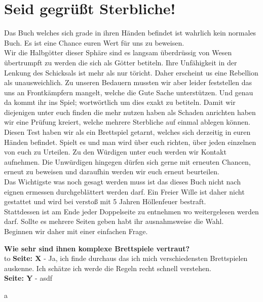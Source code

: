 \documentclass[12pt,a4paper,twoside]{book}
\begin{document}
\newpage


\section*{Seid gegrüßt Sterbliche!}


Das Buch welches sich grade in ihren Händen befindet ist wahrlich kein normales Buch. Es ist eine Chance euren Wert für uns zu beweisen.\\
Wir die Halbgötter dieser Sphäre sind es langsam überdrüssig von Wesen übertrumpft zu werden die sich als Götter betiteln. Ihre Unfähigkeit in der Lenkung des Schicksals ist mehr als nur töricht. Daher erscheint us eine Rebellion als unausweichlich. Zu unseren Bedauern mussten wir aber leider feststellen das uns an Frontkämpfern mangelt, welche die Gute Sache unterstützen. Und genau da kommt ihr ins Spiel; wortwörtlich um dies exakt zu betiteln.
Damit wir diejenigen unter euch finden die mehr nutzen haben als Schaden anrichten haben wir eine Prüfung kreiert, welche mehrere Sterbliche auf einmal ablegen können.\\
Diesen Test haben wir als ein Brettspiel getarnt, welches sich derzeitig in euren Händen befindet. Spielt es und man wird über euch richten, über jeden einzelnen von euch zu Urteilen. Zu den Würdigen unter euch werden wir Kontakt aufnehmen. Die Unwürdigen hingegen dürfen sich gerne mit erneuten Chancen, erneut zu beweisen und daraufhin werden wir euch erneut beurteilen.\\

Das Wichtigste was noch gesagt werden muss ist das dieses Buch nicht nach eignen ermessen durchgeblättert werden darf. Ein Freier Wille ist daher nicht gestattet und wird bei verstoß mit 5 Jahren Höllenfeuer bestraft.\\
Stattdessen ist am Ende jeder Doppelseite zu entnehmen wo weitergelesen werden darf. Sollte es mehrere Seiten geben habt ihr ausnahmsweise die Wahl.\\
Beginnen wir daher mit einer einfachen Frage.
\vfill


\textbf{Wie sehr sind ihnen komplexe Brettspiele vertraut?} \\
\def\dashfill{\cleaders\hbox{-}\hfill}
\hbox to \hsize{\dashfill\hfil}
\textbf{Seite: X} - Ja, ich finde durchaus das ich mich verschiedensten Brettspielen auskenne. Ich schätze ich werde die Regeln recht schnell verstehen.\\
\textbf{Seite: Y} - asdf


\newpage
a
\end{document}
